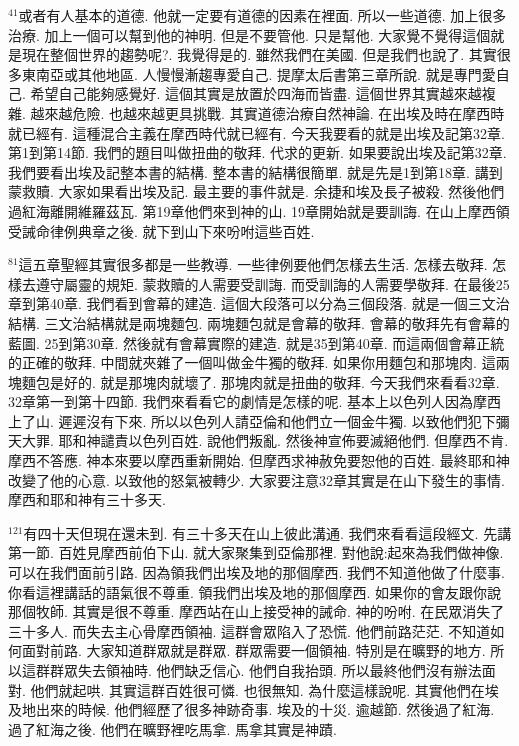 \documentclass{book}
\begin{document}
$^{41}$或者有人基本的道德.
他就一定要有道德的因素在裡面.
所以一些道德.
加上很多治療.
加上一個可以幫到他的神明.
但是不要管他.
只是幫他.
大家覺不覺得這個就是現在整個世界的趨勢呢?.
我覺得是的.
雖然我們在美國.
但是我們也說了.
其實很多東南亞或其他地區.
人慢慢漸趨專愛自己.
提摩太后書第三章所說.
就是專門愛自己.
希望自己能夠感覺好.
這個其實是放置於四海而皆盡.
這個世界其實越來越複雜.
越來越危險.
也越來越更具挑戰.
其實道德治療自然神論.
在出埃及時在摩西時就已經有.
這種混合主義在摩西時代就已經有.
今天我要看的就是出埃及記第32章.
第1到第14節.
我們的題目叫做扭曲的敬拜.
代求的更新.
如果要說出埃及記第32章.
我們要看出埃及記整本書的結構.
整本書的結構很簡單.
就是先是1到第18章.
講到蒙救贖.
大家如果看出埃及記.
最主要的事件就是.
余捷和埃及長子被殺.
然後他們過紅海離開維羅茲瓦.
第19章他們來到神的山.
19章開始就是要訓誨.
在山上摩西領受誡命律例典章之後.
就下到山下來吩咐這些百姓.

$^{81}$這五章聖經其實很多都是一些教導.
一些律例要他們怎樣去生活.
怎樣去敬拜.
怎樣去遵守屬靈的規矩.
蒙救贖的人需要受訓誨.
而受訓誨的人需要學敬拜.
在最後25章到第40章.
我們看到會幕的建造.
這個大段落可以分為三個段落.
就是一個三文治結構.
三文治結構就是兩塊麵包.
兩塊麵包就是會幕的敬拜.
會幕的敬拜先有會幕的藍圖.
25到第30章.
然後就有會幕實際的建造.
就是35到第40章.
而這兩個會幕正統的正確的敬拜.
中間就夾雜了一個叫做金牛獨的敬拜.
如果你用麵包和那塊肉.
這兩塊麵包是好的.
就是那塊肉就壞了.
那塊肉就是扭曲的敬拜.
今天我們來看看32章.
32章第一到第十四節.
我們來看看它的劇情是怎樣的呢.
基本上以色列人因為摩西上了山.
遲遲沒有下來.
所以以色列人請亞倫和他們立一個金牛獨.
以致他們犯下彌天大罪.
耶和神譴責以色列百姓.
說他們叛亂.
然後神宣佈要滅絕他們.
但摩西不肯.
摩西不答應.
神本來要以摩西重新開始.
但摩西求神赦免要恕他的百姓.
最終耶和神改變了他的心意.
以致他的怒氣被轉少.
大家要注意32章其實是在山下發生的事情.
摩西和耶和神有三十多天.

$^{121}$有四十天但現在還未到.
有三十多天在山上彼此溝通.
我們來看看這段經文.
先講第一節.
百姓見摩西前伯下山.
就大家聚集到亞倫那裡.
對他說:起來為我們做神像.
可以在我們面前引路.
因為領我們出埃及地的那個摩西.
我們不知道他做了什麼事.
你看這裡講話的語氣很不尊重.
領我們出埃及地的那個摩西.
如果你的會友跟你說那個牧師.
其實是很不尊重.
摩西站在山上接受神的誡命.
神的吩咐.
在民眾消失了三十多人.
而失去主心骨摩西領袖.
這群會眾陷入了恐慌.
他們前路茫茫.
不知道如何面對前路.
大家知道群眾就是群眾.
群眾需要一個領袖.
特別是在曠野的地方.
所以這群群眾失去領袖時.
他們缺乏信心.
他們自我抬頭.
所以最終他們沒有辦法面對.
他們就起哄.
其實這群百姓很可憐.
也很無知.
為什麼這樣說呢.
其實他們在埃及地出來的時候.
他們經歷了很多神跡奇事.
埃及的十災.
逾越節.
然後過了紅海.
過了紅海之後.
他們在曠野裡吃馬拿.
馬拿其實是神蹟.
\end{document}
